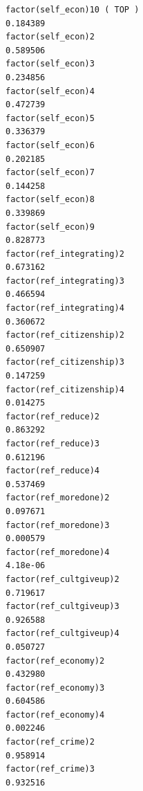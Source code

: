 \documentclass[
]{article}
\begin{document}
\begin{table}
\begin{minipage}[t]{\linewidth}
{\begin{verbatim}
factor(self_econ)10 ( TOP )                                                       0.184389
factor(self_econ)2                                                                0.589506
factor(self_econ)3                                                                0.234856
factor(self_econ)4                                                                0.472739
factor(self_econ)5                                                                0.336379
factor(self_econ)6                                                                0.202185
factor(self_econ)7                                                                0.144258
factor(self_econ)8                                                                0.339869
factor(self_econ)9                                                                0.828773
factor(ref_integrating)2                                                          0.673162
factor(ref_integrating)3                                                          0.466594
factor(ref_integrating)4                                                          0.360672
factor(ref_citizenship)2                                                          0.650907
factor(ref_citizenship)3                                                          0.147259
factor(ref_citizenship)4                                                          0.014275
factor(ref_reduce)2                                                               0.863292
factor(ref_reduce)3                                                               0.612196
factor(ref_reduce)4                                                               0.537469
factor(ref_moredone)2                                                             0.097671
factor(ref_moredone)3                                                             0.000579
factor(ref_moredone)4                                                             4.18e-06
factor(ref_cultgiveup)2                                                           0.719617
factor(ref_cultgiveup)3                                                           0.926588
factor(ref_cultgiveup)4                                                           0.050727
factor(ref_economy)2                                                              0.432980
factor(ref_economy)3                                                              0.604586
factor(ref_economy)4                                                              0.002246
factor(ref_crime)2                                                                0.958914
factor(ref_crime)3                                                                0.932516

\end{verbatim}}
\end{minipage}
\end{table}
\end{document}
